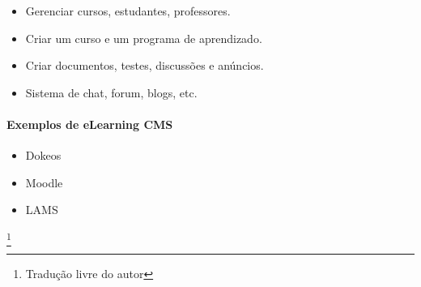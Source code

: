 \begin{itemize}
  \item Gerenciar cursos, estudantes, professores.
  \item Criar um curso e um programa de aprendizado.
  \item Criar documentos, testes, discussões e anúncios.
  \item Sistema de chat, forum, blogs, etc.
\end{itemize}

\paragraph{Exemplos de eLearning CMS} 

\begin{itemize}
  \item Dokeos
  \item Moodle
  \item LAMS
\end{itemize}


\cite{choosing_open_source_cms}\footnote{Tradução livre do autor}





